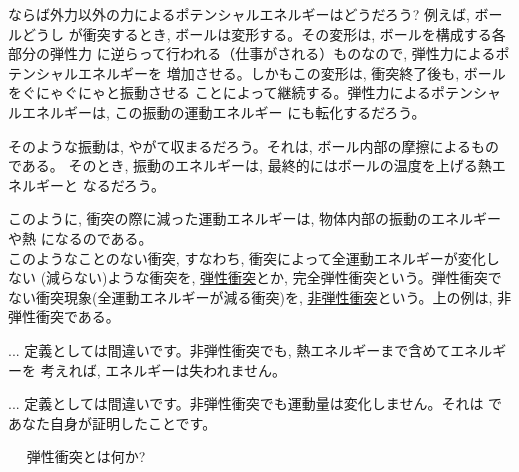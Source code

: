 ならば外力以外の力によるポテンシャルエネルギーはどうだろう? 例えば, ボールどうし
が衝突するとき, ボールは変形する。その変形は, ボールを構成する各部分の弾性力
に逆らって行われる（仕事がされる）ものなので, 弾性力によるポテンシャルエネルギーを
増加させる。しかもこの変形は, 衝突終了後も, ボールをぐにゃぐにゃと振動させる
ことによって継続する。弾性力によるポテンシャルエネルギーは, この振動の運動エネルギー
にも転化するだろう。

そのような振動は, やがて収まるだろう。それは, ボール内部の摩擦によるものである。
そのとき, 振動のエネルギーは, 最終的にはボールの温度を上げる熱エネルギーと
なるだろう。

このように, 衝突の際に減った運動エネルギーは, 物体内部の振動のエネルギーや熱
になるのである。\\

このようなことのない衝突, すなわち, 衝突によって全運動エネルギーが変化しない
(減らない)ような衝突を, \underline{弾性衝突}とか, 
完全弾性衝突という。弾性衝突でない衝突現象(全運動エネルギーが減る衝突)を, 
\underline{非弾性衝突}という。上の例は, 非弾性衝突である。
\mv

\begin{freqmiss}{\small{}
... 定義としては間違いです。非弾性衝突でも, 熱エネルギーまで含めてエネルギーを
考えれば, エネルギーは失われません。}\end{freqmiss}

\begin{freqmiss}{\small{}
... 定義としては間違いです。非弾性衝突でも運動量は変化しません。それは
であなた自身が証明したことです。}\end{freqmiss}

\begin{q}\label{q:elastic_collision}　
弾性衝突とは何か?
\end{q}
\mv

